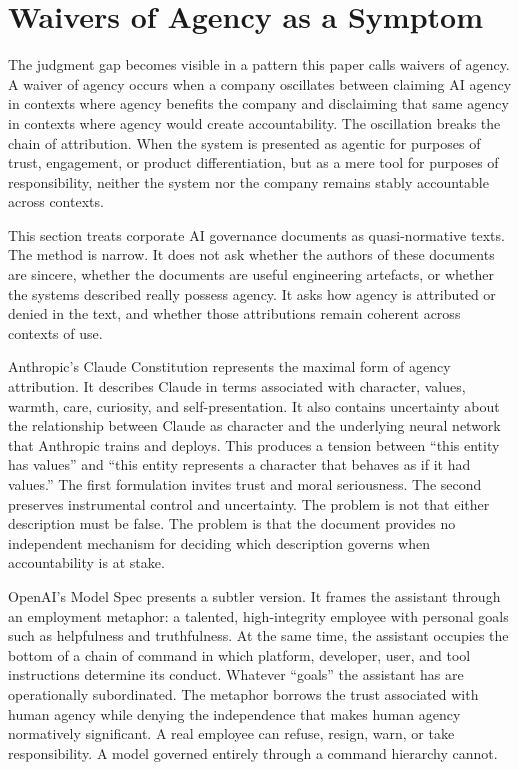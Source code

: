 \documentclass[11pt,a4paper]{article}
\begin{document}
\section{Waivers of Agency as a Symptom}
\label{sec:waivers}

The judgment gap becomes visible in a pattern this paper calls waivers of agency. A waiver of agency occurs when a company oscillates between claiming AI agency in contexts where agency benefits the company and disclaiming that same agency in contexts where agency would create accountability. The oscillation breaks the chain of attribution. When the system is presented as agentic for purposes of trust, engagement, or product differentiation, but as a mere tool for purposes of responsibility, neither the system nor the company remains stably accountable across contexts.

This section treats corporate AI governance documents as quasi-normative texts. The method is narrow. It does not ask whether the authors of these documents are sincere, whether the documents are useful engineering artefacts, or whether the systems described really possess agency. It asks how agency is attributed or denied in the text, and whether those attributions remain coherent across contexts of use.

Anthropic's Claude Constitution represents the maximal form of agency attribution. It describes Claude in terms associated with character, values, warmth, care, curiosity, and self-presentation. It also contains uncertainty about the relationship between Claude as character and the underlying neural network that Anthropic trains and deploys. This produces a tension between ``this entity has values'' and ``this entity represents a character that behaves as if it had values.'' The first formulation invites trust and moral seriousness. The second preserves instrumental control and uncertainty. The problem is not that either description must be false. The problem is that the document provides no independent mechanism for deciding which description governs when accountability is at stake.

OpenAI's Model Spec presents a subtler version. It frames the assistant through an employment metaphor: a talented, high-integrity employee with personal goals such as helpfulness and truthfulness. At the same time, the assistant occupies the bottom of a chain of command in which platform, developer, user, and tool instructions determine its conduct. Whatever ``goals'' the assistant has are operationally subordinated. The metaphor borrows the trust associated with human agency while denying the independence that makes human agency normatively significant. A real employee can refuse, resign, warn, or take responsibility. A model governed entirely through a command hierarchy cannot.
\end{document}
